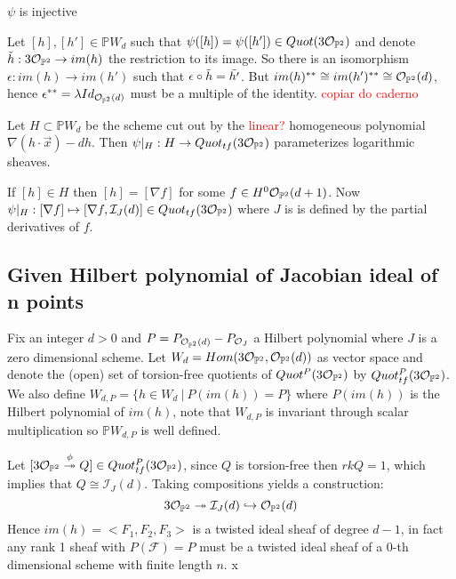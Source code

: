 \begin{proposition}
$\psi$ is injective
\end{proposition}
\begin{dem*}
Let $[h],[h'] \in \mathbb{P}W_d$ such that $\psi([h])=\psi([h']) \in Quot(3\mathcal{O}_{\mathbb{P}^2})$ and denote $\Tilde{h}:3\mathcal{O}_{\mathbb{P}^2} \to im(h)$ the restriction to its image. So there is an isomorphism $\epsilon:im(h) \to im(h')$ such that $\epsilon \circ \Tilde{h} = \Tilde{h'}$. But $im(h)^{**} \cong im(h')^{**} \cong \mathcal{O}_{\mathbb{P}^2}(d)$, hence $\epsilon^{**} = \lambda Id_{\mathcal{O}_{\mathbb{P}^2}(d)}$ must be a multiple of the identity.
\textcolor{red}{copiar do caderno}
\end{dem*}

\begin{corollary}
Let $H \subset \mathbb{P}W_d$ be the scheme cut out by the \textcolor{red}{linear?} homogeneous polynomial $\nabla(h \cdot \overrightarrow{x})-dh$. Then $\psi|_H: H \to Quot_{tf}(3\mathcal{O}_{\mathbb{P}^2})$ parameterizes logarithmic sheaves.
\end{corollary}
\begin{dem*}
If $[h] \in H$ then $[h] = [\nabla f]$ for some $f \in H^0\mathcal{O}_{\mathbb{P}^2}(d+1)$. Now $\psi|_H: [\nabla f] \mapsto [\nabla f,\mathcal{I}_J(d)] \in Quot_{tf}(3\mathcal{O}_{\mathbb{P}^2})$ where $J$ is is defined by the partial derivatives of $f$.
\end{dem*}

\subsection{Given Hilbert polynomial of Jacobian ideal of n points}
Fix an integer $d > 0$ and $P = P_{\mathcal{O}_{\mathbb{P}^2}(d)}-P_{\mathcal{O}_J}$ a Hilbert polynomial where $J$ is a zero dimensional scheme. Let $W_d = Hom(3\mathcal{O}_{\mathbb{P}^2},\mathcal{O}_{\mathbb{P}^2}(d))$ as vector space and denote the (open) set of torsion-free quotients of $Quot^P(3\mathcal{O}_{\mathbb{P}^2})$ by $Quot_{tf}^P(3 \mathcal{O}_{\mathbb{P}^2})$.
We also define $W_{d,P} = \{h \in W_d \ | \ P(im(h)) = P \}$ where $P(im(h))$ is the Hilbert polynomial of $im(h)$, note that $W_{d,P}$ is invariant through scalar multiplication so $\mathbb{P}W_{d,P}$ is well defined.

Let $[3 \mathcal{O}_{\mathbb{P}^2} \overset{\phi}{\twoheadrightarrow} Q] \in Quot_{tf}^P(3\mathcal{O}_{\mathbb{P}^2})$, since $Q$ is torsion-free then $rk Q = 1$, which implies that $Q \cong \mathcal{I}_J (d)$. Taking compositions yields a construction:  
\begin{equation}
    3\mathcal{O}_{\mathbb{P}^2} \twoheadrightarrow \mathcal{I}_J(d) \hookrightarrow \mathcal{O}_{\mathbb{P}^2}(d)
\end{equation}
Hence $im(h) = <F_1,F_2,F_3>$ is a twisted ideal sheaf of degree $d-1$, in fact any rank 1 sheaf with $P(\mathcal{F}) = P$ must be a twisted ideal sheaf of a $0$-th dimensional scheme with finite length $n$.
x

